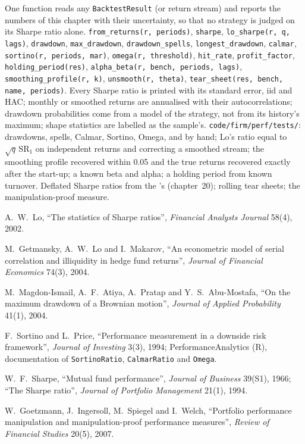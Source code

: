 \begin{build}
 One function reads any \texttt{BacktestResult} (or return stream) and reports the numbers of this chapter with their uncertainty, so that no
strategy is judged on its Sharpe ratio alone.
 \texttt{from\_returns(r, periods)}, \texttt{sharpe}, \texttt{lo\_sharpe(r, q, lags)}, \texttt{drawdown}, \texttt{max\_drawdown},
\texttt{drawdown\_spells}, \texttt{longest\_drawdown}, \texttt{calmar}, \texttt{sortino(r, periods, mar)}, \texttt{omega(r, threshold)}, \texttt{hit\_rate},
\texttt{profit\_factor}, \texttt{holding\_period(res)}, \texttt{alpha\_beta(r, bench, periods, lags)}, \texttt{smoothing\_profile(r, k)},
\texttt{unsmooth(r, theta)}, \texttt{tear\_sheet(res, bench, name, periods)}.
 Every Sharpe ratio is printed with its standard error, iid and HAC; monthly or smoothed returns are annualised with their autocorrelations;
drawdown probabilities come from a model of the strategy, not from its history's maximum; shape statistics are labelled as the sample's.
 \texttt{code/firm/perf/tests/}: drawdowns, spells, Calmar, Sortino, Omega,  and  by hand; Lo's ratio equal to
$\sqrt q\,\mathrm{SR}_1$ on independent returns and correcting a smoothed stream; the smoothing profile recovered within 0.05 and the true returns recovered
exactly after the start-up; a known beta and alpha; a holding period from known turnover.
 Deflated Sharpe ratios from the 's  (chapter~20); rolling tear sheets; the manipulation-proof measure.
\end{build}

\begin{omsources}
\item A.~W.~Lo, ``The statistics of Sharpe ratios'', \emph{Financial Analysts Journal} 58(4), 2002.
\item M.~Getmansky, A.~W.~Lo and I.~Makarov, ``An econometric model of serial correlation and illiquidity in hedge fund returns'', \emph{Journal of Financial
Economics} 74(3), 2004.
\item M.~Magdon-Ismail, A.~F.~Atiya, A.~Pratap and Y.~S.~Abu-Mostafa, ``On the maximum drawdown of a Brownian motion'', \emph{Journal of Applied Probability}
41(1), 2004.
\item F.~Sortino and L.~Price, ``Performance measurement in a downside risk framework'', \emph{Journal of Investing} 3(3), 1994; PerformanceAnalytics (R),
documentation of \texttt{SortinoRatio}, \texttt{CalmarRatio} and \texttt{Omega}.
\item W.~F.~Sharpe, ``Mutual fund performance'', \emph{Journal of Business} 39(S1), 1966; ``The Sharpe ratio'', \emph{Journal of Portfolio Management}
21(1), 1994.
\item W.~Goetzmann, J.~Ingersoll, M.~Spiegel and I.~Welch, ``Portfolio performance manipulation and manipulation-proof performance measures'', \emph{Review of
Financial Studies} 20(5), 2007.
\end{omsources}

